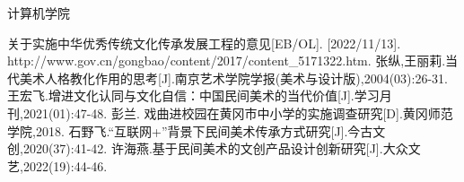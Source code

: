 \documentclass{ctexart}
\begin{document}
\begin{center}
    \textbf{}
\end{center}
\begin{center}
     计算机学院
\end{center}

\thispagestyle{empty}
\setcounter{page}{1}






\begin{thebibliography}{00}
     关于实施中华优秀传统文化传承发展工程的意见[EB/OL]. [2022/11/13]. http://www.gov.cn/gongbao/content/2017/content\_5171322.htm.
     张纵,王丽莉.当代美术人格教化作用的思考[J].南京艺术学院学报(美术与设计版),2004(03):26-31.
     王宏飞.增进文化认同与文化自信：中国民间美术的当代价值[J].学习月刊,2021(01):47-48.
     彭兰. 戏曲进校园在黄冈市中小学的实施调查研究[D].黄冈师范学院,2018.
     石野飞.“互联网+”背景下民间美术传承方式研究[J].今古文创,2020(37):41-42.
     许海燕.基于民间美术的文创产品设计创新研究[J].大众文艺,2022(19):44-46.
\end{thebibliography}
\end{document}

